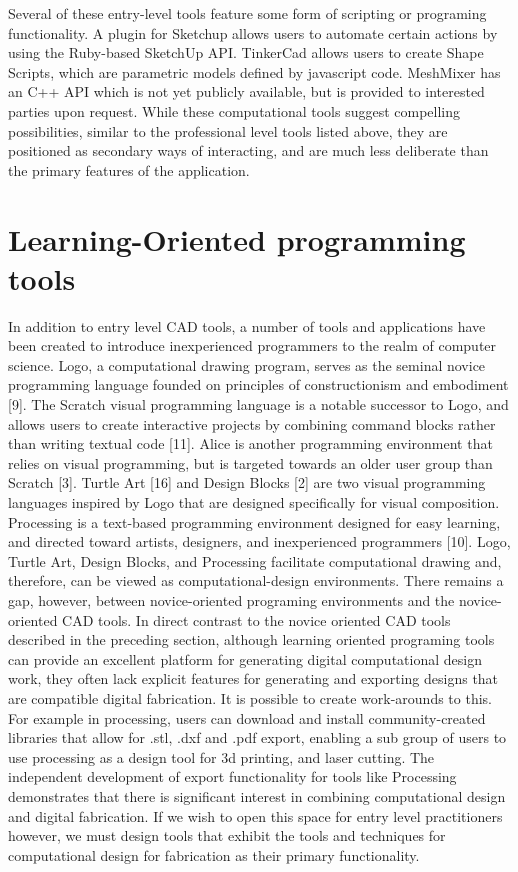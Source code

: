 Several of these entry-level tools feature some form of scripting or programing functionality. A plugin for Sketchup allows users to automate certain actions by using the Ruby-based SketchUp API. TinkerCad allows users to create Shape Scripts, which are parametric models defined by javascript code. MeshMixer has an C++ API which is not yet publicly available, but is provided to interested parties upon request. While these computational tools suggest compelling possibilities, similar to the professional level tools listed above, they are positioned as secondary ways of interacting, and are much less deliberate than the primary features of the application.

\section{Learning-Oriented programming tools}
In addition to entry level CAD tools, a number of tools and applications have been created to introduce inexperienced programmers to the realm of computer science. 
Logo, a computational drawing program, serves as the seminal novice programming language founded on principles of constructionism and embodiment [9]. The Scratch visual programming language is a notable successor to Logo, and allows users to create interactive projects by combining command blocks rather than writing textual code [11]. Alice is another programming environment that relies on visual programming, but is targeted towards an older user group than Scratch [3]. Turtle Art [16] and Design Blocks [2] are two visual programming languages inspired by Logo that are designed specifically for visual composition. Processing is a text-based programming environment designed for easy learning, and directed toward artists, designers, and inexperienced programmers [10].
Logo, Turtle Art, Design Blocks, and Processing facilitate computational drawing and, therefore, can be viewed as computational-design environments. There remains a gap, however, between novice-oriented programing environments and the novice-oriented CAD tools. In direct contrast to the novice oriented CAD tools described in the preceding section, although learning oriented programing tools can provide an excellent platform for generating digital computational design work, they often lack explicit features for generating and exporting designs that are compatible digital fabrication. It is possible to create work-arounds to this. For example in processing, users can download and install community-created libraries that allow for .stl, .dxf and .pdf export, enabling a sub group of users to use processing as a design tool for 3d printing, and laser cutting. The independent development of export functionality for tools like Processing demonstrates that there is significant interest in combining computational design and digital fabrication. If we wish to open this space for entry level practitioners however, we must design tools that exhibit the tools and techniques for computational design for fabrication as their primary functionality.


